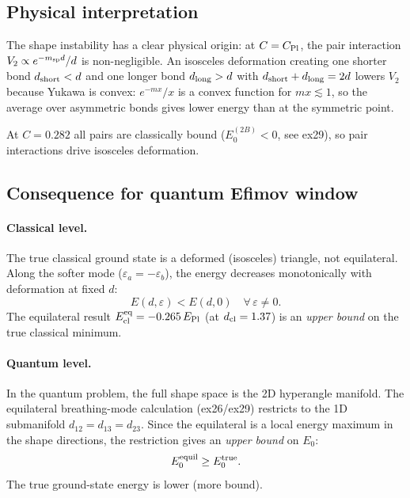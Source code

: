 \subsection{Physical interpretation}

The shape instability has a clear physical origin: at $C=C_{\rm Pl}$,
the pair interaction $V_2\propto e^{-m_{\rm sp}d}/d$ is non-negligible.
An isosceles deformation creating one shorter bond $d_{\rm short}<d$ and
one longer bond $d_{\rm long}>d$ with $d_{\rm short}+d_{\rm long}=2d$ lowers
$V_2$ because Yukawa is convex: $e^{-mx}/x$ is a convex function for
$mx\lesssim1$, so the average over asymmetric bonds gives lower energy
than at the symmetric point.

At $C=0.282$ all pairs are classically bound ($E_0^{(2B)}<0$, see ex29),
so pair interactions drive isosceles deformation.

\subsection{Consequence for quantum Efimov window}

\paragraph{Classical level.}
The true classical ground state is a deformed (isosceles) triangle, not equilateral.
Along the softer mode ($\varepsilon_a=-\varepsilon_b$), the energy decreases
monotonically with deformation at fixed $d$:
\begin{equation}
  E(d,\varepsilon) < E(d,0) \quad \forall\, \varepsilon\neq0.
\end{equation}
The equilateral result $E_{\rm cl}^{\rm eq}=-0.265\,E_{\rm Pl}$ (at $d_{\rm cl}=1.37$)
is an \emph{upper bound} on the true classical minimum.

\paragraph{Quantum level.}
In the quantum problem, the full shape space is the 2D hyperangle manifold.
The equilateral breathing-mode calculation (ex26/ex29) restricts to the
1D submanifold $d_{12}=d_{13}=d_{23}$.  Since the equilateral is a
local energy maximum in the shape directions, the restriction gives an
\emph{upper bound} on $E_0$:
\begin{equation}
  E_0^{\rm equil} \geq E_0^{\rm true}.
\end{equation}
The true ground-state energy is lower (more bound).

